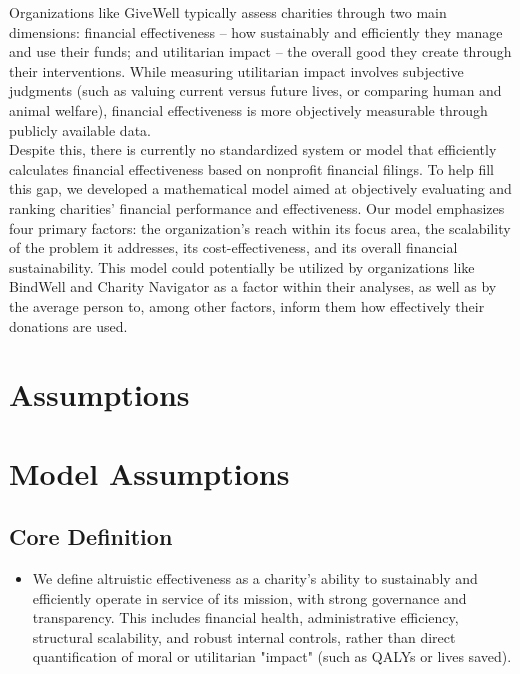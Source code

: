 \documentclass[12pt]{article}
\begin{document}
Organizations like GiveWell typically assess charities through two main dimensions: financial effectiveness – how sustainably and efficiently they manage and use their funds; and utilitarian impact – the overall good they create through their interventions. While measuring utilitarian impact involves subjective judgments (such as valuing current versus future lives, or comparing human and animal welfare), financial effectiveness is more objectively measurable through publicly available data. \\

Despite this, there is currently no standardized system or model that efficiently calculates financial effectiveness based on nonprofit financial filings. To help fill this gap, we developed a mathematical model aimed at objectively evaluating and ranking charities' financial performance and effectiveness. Our model emphasizes four primary factors: the organization's reach within its focus area, the scalability of the problem it addresses, its cost-effectiveness, and its overall financial sustainability. This model could potentially be utilized by organizations like BindWell and Charity Navigator as a factor within their analyses, as well as by the average person to, among other factors, inform them how effectively their donations are used. 

\section{Assumptions}

\section*{Model Assumptions}

\subsection*{Core Definition}
\begin{itemize}
    \item We define altruistic effectiveness as a charity's ability to sustainably and efficiently operate in service of its mission, with strong governance and transparency. This includes financial health, administrative efficiency, structural scalability, and robust internal controls, rather than direct quantification of moral or utilitarian "impact" (such as QALYs or lives saved).
\end{itemize}
\end{document}
